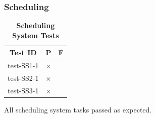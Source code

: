 \documentclass[12pt, titlepage]{article}
\begin{document}
\subsubsection{Scheduling}

\begin{table}[H]
\centering
\begin{tabular}{|c|c|c|}
\hline
Test ID & P & F\\
\hline 
test-SS1-1 & $\times$ & \\
test-SS2-1 & $\times$ & \\
test-SS3-1 & $\times$ & \\
\hline
\end{tabular}
\caption{\bf Scheduling System Tests}
\end{table}

All scheduling system tasks passed as expected.


					
					
					




					
					
					



					
					
					
\end{document}
